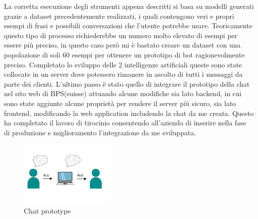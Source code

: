 La corretta esecuzione degli strumenti appena descritti si basa su modelli generati grazie a dataset precedentemente realizzati, i quali contengono veri e propri esempi di frasi e possibili conversazioni che l'utente potrebbe usare.
Teoricamente questo tipo di processo richiederebbe un numero molto elevato di esempi per essere più preciso, in questo caso però mi è bastato creare un dataset con una popolazione di soli 60 esempi per ottenere un prototipo di bot ragionevolmente preciso. 
Completato lo sviluppo delle 2 intelligenze artificiali queste sono state collocate in un server dove potessero rimanere in ascolto di tutti i messaggi da parte dei clienti.
L'ultimo passo è stato quello di integrare il prototipo della chat nel sito web di BPS(suisse) attuando alcune modifiche sia lato backend, in cui sono state aggiunte alcune proprietà per rendere il server più sicuro, sia lato frontend, modificando la web application includendo la chat da me creata.
Questo ha completato il lavoro di tirocinio consentendo all'azienda di inserire nella fase di produzione e miglioramento l'integrazione da me sviluppata.
\begin{figure}[H]
 \centering
    \includegraphics[width=0.4\textwidth]{img/nlu_nlg.png}
 \caption{Chat prototype}
\end{figure}

